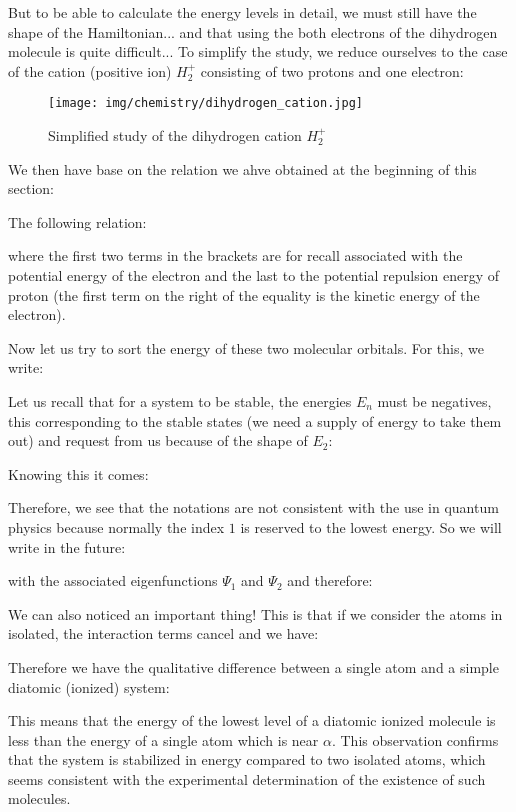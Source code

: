 	But to be able to calculate the energy levels in detail, we must still have the shape of the Hamiltonian... and that using the both electrons of the dihydrogen molecule is quite difficult... To simplify the study, we reduce ourselves to the case of the cation (positive ion) $H_2^{+}$ consisting of two protons and one electron:
	\begin{figure}[H]
		\begin{center}
		\texttt{[image: img/chemistry/dihydrogen\_cation.jpg]}
		\end{center}	
		\caption{Simplified study of the dihydrogen cation $H_2^+$}
	\end{figure}
	We then have base on the relation we ahve obtained at the beginning of this section:
	
	The following relation:
	
	where the first two terms in the brackets are for recall associated with the potential energy of the electron and the last to the potential repulsion energy of proton (the first term on the right of the equality is the kinetic energy of the electron).

	Now let us try to sort the energy of these two molecular orbitals. For this, we write:
	
	Let us recall that for a system to be stable, the energies  $E_n$ must be negatives, this corresponding to the stable states (we need a supply of energy to take them out) and request from us because of the shape of $E_2$:
	
	Knowing this it comes:
	
	Therefore, we see that the notations are not consistent with the use in quantum physics because normally the index $1$ is reserved to the lowest energy. So we will write in the future:
	
	with the associated eigenfunctions  $\Psi_1$ and $\Psi_2$ and therefore:
	
	We can also noticed an important thing! This is that if we consider the atoms in isolated, the interaction terms cancel and we have:
	
	Therefore we have the qualitative difference between a single atom and a simple diatomic (ionized) system:
	
	This means that the energy of the lowest level of a diatomic ionized molecule is less than the energy of a single atom which is near $\alpha$. This observation confirms that the system is stabilized in energy compared to two isolated atoms, which seems consistent with the experimental determination of the existence of such molecules.
	

